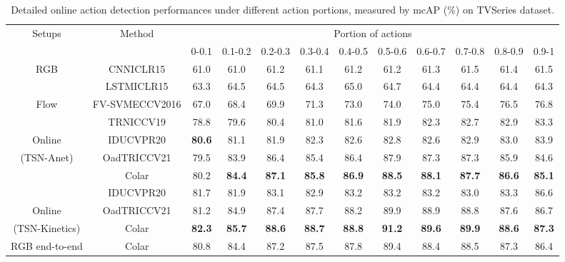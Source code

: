 \documentclass[10pt,twocolumn,letterpaper]{article}
\begin{document}
\begin{table*}[thbp]
  \centering
  \caption{Detailed online action detection performances under different action portions, measured by mcAP (\%) on TVSeries dataset.}
  \setlength{\tabcolsep}{3.5pt}
   \begin{tabular}{cc|cccccccccc}
    \toprule
    \toprule
    \multirow{2}[2]{*}{Setups} & \multirow{2}[2]{*}{Method} & \multicolumn{10}{c}{Portion of actions} \\
          &       & 0-0.1 & 0.1-0.2 & 0.2-0.3 & 0.3-0.4 & 0.4-0.5 & 0.5-0.6 & 0.6-0.7 & 0.7-0.8 & 0.8-0.9 & 0.9-1 \\
    \midrule
    \midrule
    \multirow{2}[2]{*}{RGB} & CNN\cite{de2016online}{\scriptsize ICLR15} & 61.0  & 61.0  & 61.2  & 61.1  & 61.2  & 61.2  & 61.3  & 61.5  & 61.4  & 61.5 \\
          & LSTM\cite{de2016online}{\scriptsize ICLR15} & 63.3  & 64.5  & 64.5  & 64.3  & 65.0  & 64.7  & 64.4  & 64.4  & 64.4  & 64.3 \\
    \midrule
    Flow  & {\footnotesize FV-SVM}\cite{de2016online}{\scriptsize ECCV2016} & 67.0  & 68.4  & 69.9  & 71.3  & 73.0  & 74.0  & 75.0  & 75.4  & 76.5  & 76.8 \\
    \midrule
          & TRN\cite{xu2019temporal}{\scriptsize ICCV19} & 78.8  & 79.6  & 80.4  & 81.0  & 81.6  & 81.9  & 82.3  & 82.7  & 82.9  & 83.3 \\
    Online & IDU\cite{eun2020learning}{\scriptsize CVPR20} & \textbf{80.6} & 81.1  & 81.9  & 82.3  & 82.6  & 82.8  & 82.6  & 82.9  & 83.0  & 83.9 \\
    (TSN-Anet) & OadTR\cite{wang2021oadtr}{\scriptsize ICCV21} & 79.5  & 83.9  & 86.4  & 85.4  & 86.4  & 87.9  & 87.3  & 87.3  & 85.9  & 84.6 \\
          & Colar & 80.2  & \textbf{84.4} & \textbf{87.1} & \textbf{85.8} & \textbf{86.9} & \textbf{88.5} & \textbf{88.1} & \textbf{87.7} & \textbf{86.6} & \textbf{85.1} \\
    \midrule
          & IDU\cite{eun2020learning}{\scriptsize CVPR20} & 81.7  & 81.9  & 83.1  & 82.9  & 83.2  & 83.2  & 83.2  & 83.0  & 83.3  & 86.6 \\
    Online & OadTR\cite{wang2021oadtr}{\scriptsize ICCV21} & 81.2  & 84.9  & 87.4  & 87.7  & 88.2  & 89.9  & 88.9  & 88.8  & 87.6  & 86.7 \\
    (TSN-Kinetics) & Colar & \textbf{82.3} & \textbf{85.7} & \textbf{88.6} & \textbf{88.7} & \textbf{88.8} & \textbf{91.2} & \textbf{89.6} & \textbf{89.9} & \textbf{88.6} & \textbf{87.3} \\
    \midrule
    RGB end-to-end & Colar & 80.8  & 84.4  & 87.2  & 87.5  & 87.8  & 89.4  & 88.4  & 88.5  & 87.3  & 86.4 \\
    \bottomrule
    \end{tabular}\label{tabCmpPortion}\vspace{-0.3cm}
\end{table*}
\end{document}
